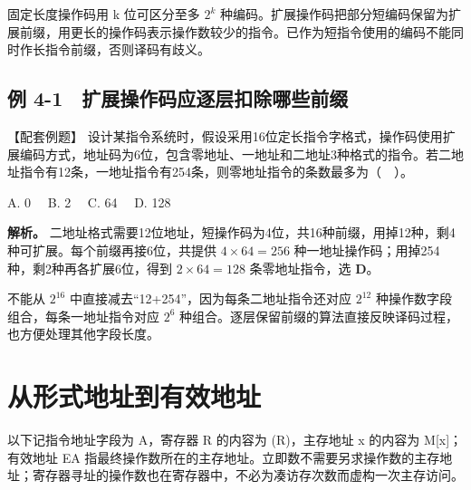 固定长度操作码用 k 位可区分至多 \(2^k\) 种编码。扩展操作码把部分短编码保留为扩展前缀，用更长的操作码表示操作数较少的指令。已作为短指令使用的编码不能同时作长指令前缀，否则译码有歧义。

\subsection{例 4-1　扩展操作码应逐层扣除哪些前缀}\label{CO04-03}

\begin{example}[配套例题]

【配套例题】 设计某指令系统时，假设采用16位定长指令字格式，操作码使用扩展编码方式，地址码为6位，包含零地址、一地址和二地址3种格式的指令。若二地址指令有12条，一地址指令有254条，则零地址指令的条数最多为（　）。

A. 0　 B. 2　 C. 64　 D. 128

\end{example}

\textbf{解析。} 二地址格式需要12位地址，短操作码为4位，共16种前缀，用掉12种，剩4种可扩展。每个前缀再接6位，共提供 \(4\times64=256\) 种一地址操作码；用掉254种，剩2种再各扩展6位，得到 \(2\times64=128\) 条零地址指令，选 \textbf{D}。

不能从 \(2^{16}\) 中直接减去``12+254''，因为每条二地址指令还对应 \(2^{12}\) 种操作数字段组合，每条一地址指令对应 \(2^6\) 种组合。逐层保留前缀的算法直接反映译码过程，也方便处理其他字段长度。

\section{从形式地址到有效地址}\label{CO04-04}

以下记指令地址字段为 A，寄存器 R 的内容为 (R)，主存地址 x 的内容为 M{[}x{]}；有效地址 EA 指最终操作数所在的主存地址。立即数不需要另求操作数的主存地址；寄存器寻址的操作数也在寄存器中，不必为凑访存次数而虚构一次主存访问。

